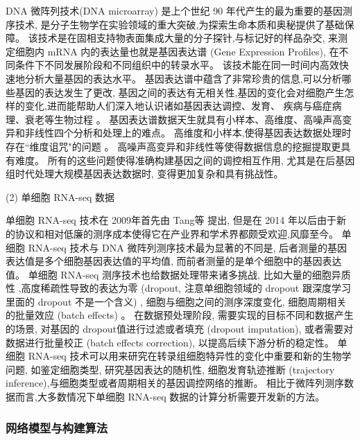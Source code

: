DNA 微阵列技术(DNA microarray) 是上个世纪 90 年代产生的最为重要的基因测序技术,
是分子生物学在实验领域的重大突破,为探索生命本质和奥秘提供了基础保障。
该技术是在固相支持物表面集成大量的分子探针,与标记好的样品杂交,
来测定细胞内 mRNA 内的表达量也就是基因表达谱 (Gene Expression Profiles),
在不同条件下不同发展阶段和不同组织中的转录水平。
该技术能在同一时间内高效快速地分析大量基因的表达水平。
基因表达谱中蕴含了非常珍贵的信息,可以分析哪些基因的表达发生了更改, 
基因之间的表达有无相关性,基因的变化会对细胞产生怎样的变化,进而能帮助人们深入地认识诸如基因表达调控、发育、
疾病与癌症病理、衰老等生物过程 。
基因表达谱数据天生就具有小样本、高维度、高噪声高变异和非线性四个分析和处理上的难点。
高维度和小样本,使得基因表达数据处理时存在``维度诅咒"的问题 。
高噪声高变异和非线性等使得数据信息的挖掘提取更具有难度。
所有的这些问题使得准确构建基因之间的调控相互作用,
尤其是在后基因组时代处理大规模基因表达数据时,
变得更加复杂和具有挑战性。

(2) 单细胞 RNA-seq 数据

单细胞 RNA-seq 技术在 2009年首先由 Tang等 提出,
但是在 2014 年以后由于新的协议和相对低廉的测序成本使得它在产业界和学术界都颇受欢迎,风靡至今。
单细胞 RNA-seq 技术与 DNA 微阵列测序技术最为显著的不同是,
后者测量的基因表达值是多个细胞基因表达值的平均值,
而前者测量的是单个细胞中的基因表达值。
单细胞 RNA-seq 测序技术也给数据处理带来诸多挑战,
比如大量的细胞异质性 ,高度稀疏性导致的表达为零 (dropout, 注意单细胞领域的 dropout 跟深度学习里面的 dropout 不是一个含义) , 细胞与细胞之间的测序深度变化, 细胞周期相关的批量效应 (batch effects) 。
在数据预处理阶段, 需要实现的目标不同和数据产生的场景, 对基因的 dropout值进行过滤或者填充 (dropout imputation), 或者需要对数据进行批量校正 (batch effects correction), 以提高后续下游分析的稳定性。
单细胞 RNA-seq 技术可以用来研究在转录组细胞特异性的变化中重要和新的生物学问题,
如鉴定细胞类型, 研究基因表达的随机性, 细胞发育轨迹推断 (trajectory inference),与细胞类型或者周期相关的基因调控网络的推断。
相比于微阵列测序数据而言,大多数情况下单细胞 RNA-seq 数据的计算分析需要开发新的方法。

\subsubsection{网络模型与构建算法}

